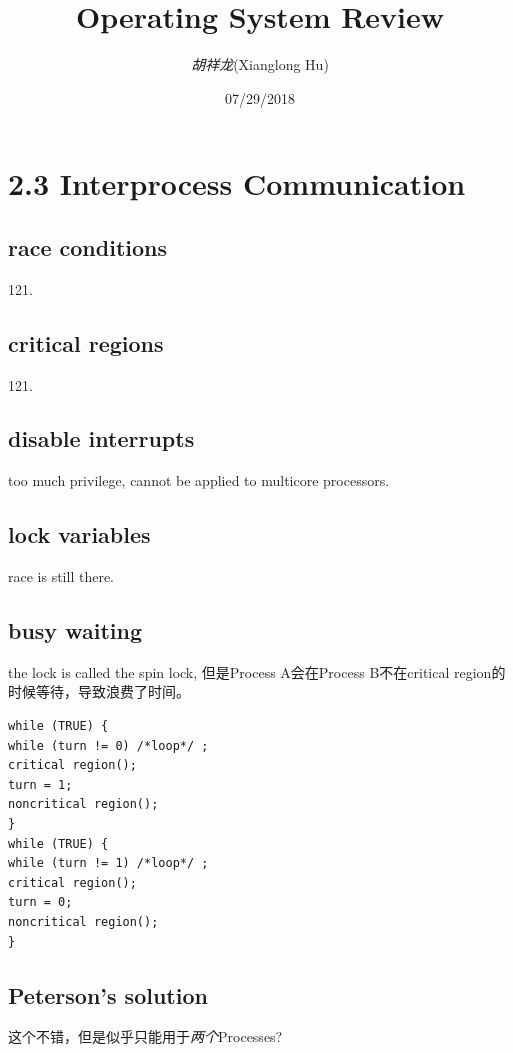 \documentclass[a4paper]{article}
\title{Operating System Review}
\author{\textit{胡祥龙}(Xianglong Hu)}
\date{07/29/2018}
\begin{document}
\maketitle
\tableofcontents
\newpage

\section{2.3 Interprocess Communication}
\subsection{race conditions} 
121.

\subsection{critical regions}
  121.

\subsection{disable interrupts}
too much privilege, cannot be applied to multicore processors. 

\subsection{lock variables}
race is still there. 

\subsection{busy waiting}
the lock is called the spin lock, 但是Process A会在Process B不在critical region的时候等待，导致浪费了时间。

\begin{centering}
\begin{verbatim}
while (TRUE) { 
while (turn != 0) /*loop*/ ;
critical region();
turn = 1; 
noncritical region();
}
while (TRUE) { 
while (turn != 1) /*loop*/ ;
critical region();
turn = 0; 
noncritical region();
}
\end{verbatim}
\end{centering} 

\subsection{Peterson's solution}
这个不错，但是似乎只能用于\textit{两个}Processes?
\end{document}
